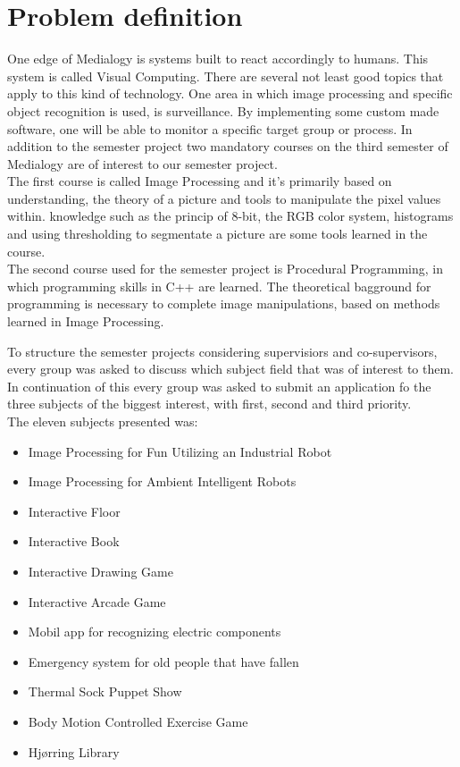 \chapter{Problem definition}
One edge of Medialogy is systems built to react accordingly to humans. This system is called Visual Computing. There are several not least good topics that apply to this kind of technology. One area in which image processing and specific object recognition is used, is surveillance. By implementing some custom made software, one will be able to monitor a specific target group or process. In addition to the semester project two mandatory courses on the third semester of Medialogy are of interest to our semester project.\\
The first course is called Image Processing and it's primarily based on understanding, the theory of a picture and tools to manipulate the pixel values within. knowledge such as the princip of 8-bit, the RGB color system, histograms and using thresholding to segmentate a picture are some tools learned in the course.\\
The second course used for the semester project is Procedural Programming, in which programming skills in C++ are learned. The theoretical bagground for programming is necessary to complete image manipulations, based on methods learned in Image Processing.

To structure the semester projects considering supervisiors and co-supervisors, every group was asked to discuss which subject field that was of interest to them. In continuation of this every group was asked to submit an application fo the three subjects of the biggest interest, with first, second and third priority.\\
The eleven subjects presented was:

\begin{itemize}
\item Image Processing for Fun Utilizing an Industrial Robot
\item Image Processing for Ambient Intelligent Robots
\item Interactive Floor
\item Interactive Book
\item Interactive Drawing Game
\item Interactive Arcade Game
\item Mobil app for recognizing electric components
\item Emergency system for old people that have fallen
\item Thermal Sock Puppet Show
\item Body Motion Controlled Exercise Game
\item Hjørring Library
\end{itemize}


